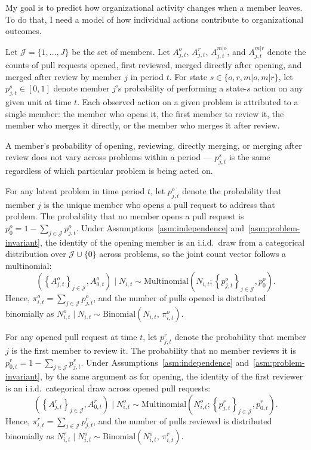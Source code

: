 \documentclass[source/paper/main.tex]{subfiles}
\begin{document}
My goal is to predict how organizational activity changes when a member leaves.
To do that, I need a model of how individual actions contribute to organizational outcomes.

Let $\mathcal{J} = \{1, \ldots, J\}$ be the set of members.
Let $A_{j,t}^o$, $A_{j,t}^r$, $A_{j,t}^{m|o}$, and $A_{j,t}^{m|r}$ denote the counts of pull requests opened, first reviewed, merged directly after opening, and merged after review by member $j$ in period $t$.
For state $s \in \{o, r, m|o, m|r\}$, let $p_{j,t}^s \in [0,1]$ denote member $j$'s probability of performing a state-$s$ action on any given unit at time $t$.
Each observed action on a given problem is attributed to a single member: the member who opens it, the first member to review it, the member who merges it directly, or the member who merges it after review.

\begin{assumption}
\label{asm:problem-invariant}
A member's probability of opening, reviewing, directly merging, or merging after review does not vary across problems within a period --- $p_{j,t}^s$ is the same regardless of which particular problem is being acted on.
\end{assumption}

For any latent problem in time period $t$, let $p_{j,t}^o$ denote the probability that member $j$ is the unique member who opens a pull request to address that problem.
The probability that no member opens a pull request is $p_{0}^o = 1-\sum_{j\in\mathcal J} p_{j,t}^o$.
Under Assumptions~\ref{asm:independence} and~\ref{asm:problem-invariant}, the identity of the opening member is an i.i.d.\ draw from a categorical distribution over $\mathcal{J} \cup \{0\}$ across problems, so the joint count vector follows a multinomial:
$$ \left( \left\{A_{j,t}^o \right\}_{j\in\mathcal J}, A_{0, t}^o \right) \mid N_{i,t} \sim \text{Multinomial}\left(N_{i,t}; \left \{p_{j,t}^o \right \}_{j\in\mathcal J}, p_{0}^o \right). $$
Hence, $\pi_{i,t}^o = \sum_{j\in\mathcal J}p_{j,t}^o$, and the number of pulls opened is distributed binomially as $N_{i,t}^o \mid N_{i,t} \sim \text{Binomial}(N_{i,t},\, \pi_{i,t}^o)$.

For any opened pull request at time $t$, let $p_{j,t}^r$ denote the probability that member $j$ is the first member to review it.
The probability that no member reviews it is $p_{0,t}^r = 1-\sum_{j\in\mathcal J} p_{j,t}^r$.
Under Assumptions~\ref{asm:independence} and~\ref{asm:problem-invariant}, by the same argument as for opening, the identity of the first reviewer is an i.i.d.\ categorical draw across opened pull requests:
$$ \left( \left\{A_{j,t}^r \right\}_{j\in\mathcal J}, A_{0, t}^r \right) \mid N_{i,t}^o \sim \text{Multinomial}\left(N_{i,t}^o; \left \{p_{j,t}^r \right \}_{j\in\mathcal J}, p_{0,t}^r \right). $$
Hence, $\pi_{i,t}^r = \sum_{j\in\mathcal J}p_{j,t}^r$, and the number of pulls reviewed is distributed binomially as $N_{i,t}^r \mid N_{i,t}^o \sim \text{Binomial}(N_{i,t}^o,\, \pi_{i,t}^r)$.
\end{document}
